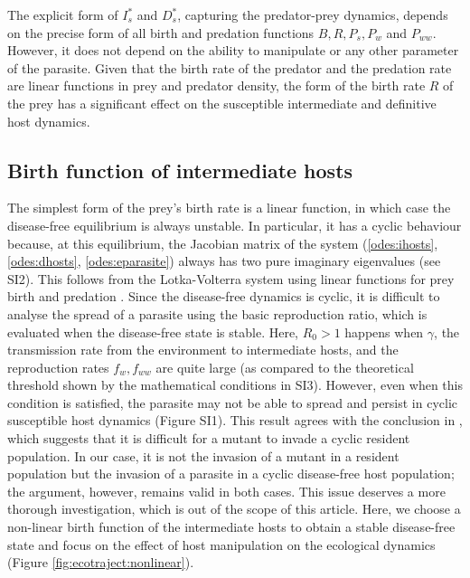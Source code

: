 \documentclass[a4paper]{scrartcl}
\begin{document}
The explicit form of $I_s^*$ and $D_s^*$, capturing the predator-prey dynamics, depends on the precise form of all birth and predation functions $B, R, P_s, P_w$ and $P_{ww}$.
However, it does not depend on the ability to manipulate or any other parameter of the parasite. 
Given that the birth rate of the predator and the predation rate are linear functions in prey and predator density, the form of the birth rate $R$ of the prey has a significant effect on the susceptible intermediate and definitive host dynamics.

\subsection*{Birth function of intermediate hosts}

The simplest form of the prey's birth rate is a linear function, in which case the disease-free equilibrium is always unstable. In particular, it has a cyclic behaviour because, at this equilibrium, the Jacobian matrix of the system (\ref{odes:ihosts}, \ref{odes:dhosts}, \ref{odes:eparasite}) always has two pure imaginary eigenvalues (see SI2). 
This follows from the Lotka-Volterra system using linear functions for prey birth and predation \citep{Lotka1920}.
Since the disease-free dynamics is cyclic, it is difficult to analyse the spread of a parasite using the basic reproduction ratio, which is evaluated when the disease-free state is stable. 
Here,  $R_0 > 1$  happens when $\gamma$, the transmission rate from the environment to intermediate hosts, and the reproduction rates $f_w, f_{ww}$ are quite large (as compared to the theoretical threshold shown by the mathematical conditions in SI3). 
However, even when this condition is satisfied, the parasite may not be able to spread and persist in cyclic susceptible host dynamics (Figure SI1). 
This result agrees with the conclusion in \citep{Ripa:Evol:2013}, which suggests that it is difficult for a mutant to invade a cyclic resident population. 
In our case, it is not the invasion of a mutant in a resident population but the invasion of a parasite in a cyclic disease-free host population; the argument, however, remains valid in both cases. 
This issue deserves a more thorough investigation, which is out of the scope of this article. 
Here, we choose a non-linear birth function of the intermediate hosts to obtain a stable disease-free state and focus on the effect of host manipulation on the ecological dynamics (Figure \ref{fig:ecotraject:nonlinear}). 
\end{document}
